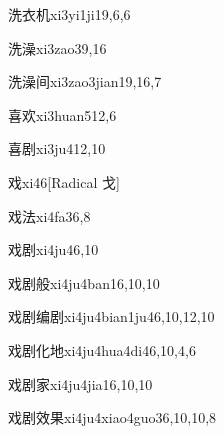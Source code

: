 \begin{entry}{洗衣机}{xi3yi1ji1}{9,6,6}
\end{entry}

\begin{entry}{洗澡}{xi3zao3}{9,16}
\end{entry}

\begin{entry}{洗澡间}{xi3zao3jian1}{9,16,7}
\end{entry}

\begin{entry}{喜欢}{xi3huan5}{12,6}
\end{entry}

\begin{entry}{喜剧}{xi3ju4}{12,10}
\end{entry}

\begin{entry}{戏}{xi4}{6}[Radical 戈]
\end{entry}

\begin{entry}{戏法}{xi4fa3}{6,8}
\end{entry}

\begin{entry}{戏剧}{xi4ju4}{6,10}
\end{entry}

\begin{entry}{戏剧般}{xi4ju4ban1}{6,10,10}
\end{entry}

\begin{entry}{戏剧编剧}{xi4ju4bian1ju4}{6,10,12,10}
\end{entry}

\begin{entry}{戏剧化地}{xi4ju4hua4di4}{6,10,4,6}
\end{entry}

\begin{entry}{戏剧家}{xi4ju4jia1}{6,10,10}
\end{entry}

\begin{entry}{戏剧效果}{xi4ju4xiao4guo3}{6,10,10,8}
\end{entry}

